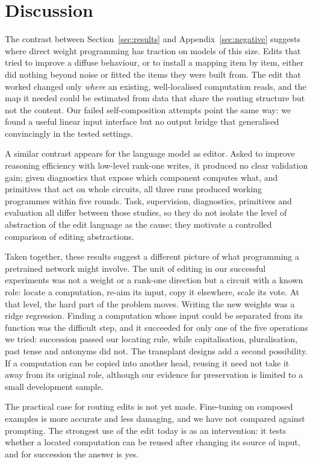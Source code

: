 \documentclass[11pt]{article}
\begin{document}
\section{Discussion}

The contrast between Section~\ref{sec:results} and Appendix~\ref{sec:negative} suggests where direct weight programming has traction on models of this size. Edits that tried to improve a diffuse behaviour, or to install a mapping item by item, either did nothing beyond noise or fitted the items they were built from. The edit that worked changed only \emph{where} an existing, well-localised computation reads, and the map it needed could be estimated from data that share the routing structure but not the content. Our failed self-composition attempts point the same way: we found a useful linear input interface but no output bridge that generalised convincingly in the tested settings.

A similar contrast appears for the language model as editor. Asked to improve reasoning efficiency with low-level rank-one writes, it produced no clear validation gain; given diagnostics that expose which component computes what, and primitives that act on whole circuits, all three runs produced working programmes within five rounds. Task, supervision, diagnostics, primitives and evaluation all differ between those studies, so they do not isolate the level of abstraction of the edit language as the cause; they motivate a controlled comparison of editing abstractions.

Taken together, these results suggest a different picture of what programming a pretrained network might involve. The unit of editing in our successful experiments was not a weight or a rank-one direction but a circuit with a known role: locate a computation, re-aim its input, copy it elsewhere, scale its vote. At that level, the hard part of the problem moves. Writing the new weights was a ridge regression. Finding a computation whose input could be separated from its function was the difficult step, and it succeeded for only one of the five operations we tried: succession passed our locating rule, while capitalisation, pluralisation, past tense and antonyms did not. The transplant designs add a second possibility. If a computation can be copied into another head, reusing it need not take it away from its original role, although our evidence for preservation is limited to a small development sample.

The practical case for routing edits is not yet made. Fine-tuning on composed examples is more accurate and less damaging, and we have not compared against prompting. The strongest use of the edit today is as an intervention: it tests whether a located computation can be reused after changing its source of input, and for succession the answer is yes.
\end{document}
